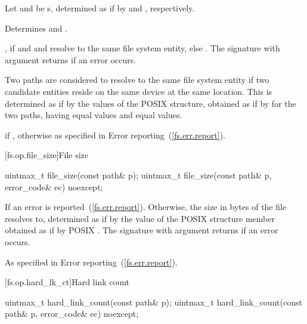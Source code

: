 \begin{itemdescr}
\pnum
Let  and  be s, determined
as if by  and , respectively.

\pnum
\effects Determines  and .

\pnum
\returns {}, if  and  and  resolve to the same file
  system entity, else . The signature with argument 
  returns  if an error occurs.

\pnum
Two paths are considered to resolve to the same file system entity if two
  candidate entities reside on the same device at the same location. This is
  determined as if by the values of the POSIX  structure,
  obtained as if by  for the two paths, having equal  values
  and equal  values.

\pnum
\throws {} if ,
  otherwise as specified in Error reporting~(\ref{fs.err.report}).
\end{itemdescr}


[fs.op.file_size]{File size}

\begin{itemdecl}
uintmax_t file_size(const path& p);
uintmax_t file_size(const path& p, error_code& ec) noexcept;
\end{itemdecl}

\begin{itemdescr}
\pnum
\returns If 
  an error is reported~(\ref{fs.err.report}). Otherwise, the size in bytes of the file
   resolves to, determined as if by the value of the POSIX 
  structure member  obtained as if by POSIX .
   The signature
  with argument  returns 
  if an error occurs.

\pnum
\throws As specified in Error reporting~(\ref{fs.err.report}).
\end{itemdescr}


[fs.op.hard_lk_ct]{Hard link count}

\begin{itemdecl}
uintmax_t hard_link_count(const path& p);
uintmax_t hard_link_count(const path& p, error_code& ec) noexcept;
\end{itemdecl}

